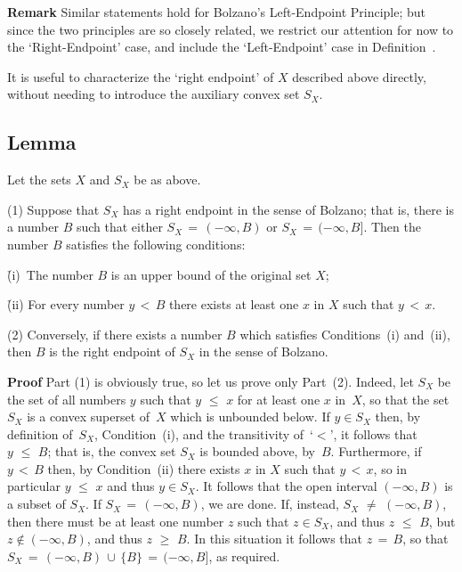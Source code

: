         {\bf Remark} Similar statements hold for Bolzano's Left-Endpoint Principle; but since the two principles are so closely related,
    we restrict our attention for now to the `Right-Endpoint' case, and include the `Left-Endpoint' case in Definition~.

\VV

        It is useful to characterize the `right endpoint' of $X$ described above directly,
    without needing to introduce the auxiliary convex set $S_{X}$.

\V

            \subsection{\small{{\bf Lemma}}}
            \label{LemmaB30.08}

\V

         Let the sets $X$ and $S_{X}$ be as above.

\V

        (1) Suppose that $S_{X}$ has a right endpoint in the sense of Bolzano;
that is, there is a number $B$
    such that either $S_{X} \,=\, (-{\infty},B)$ or $S_{X} \,=\, (-{\infty},B]$. Then the number $B$ satisfies the following conditions:

\VA

        \h (i)\, The number $B$ is an upper bound of the original set $X$;

        \h (ii) For every number $y\,<\,B$ there exists at least one $x$ in $X$ such that $y\,<\,x$.

\VA

        (2) Conversely, if there exists a number $B$ which satisfies Conditions~(i) and~(ii),
    then $B$ is the right endpoint of $S_{X}$ in the sense of Bolzano.

\V

        {\bf Proof} Part (1) is obviously true, so let us prove only Part~(2).
    Indeed, let $S_{X}$ be the set of all numbers $y$ such that $y\,\,{\leq}\,\,x$ for at least one $x$ in~$X$,
    so that the set $S_{X}$ is a convex superset of~$X$ which is unbounded below.
    If $y{\in}S_{X}$ then, by definition of~$S_{X}$, Condition~(i), and the transitivity of~`$<$',
    it follows that $y\,\,{\leq}\,\,B$; that is, the convex set $S_{X}$ is bounded above, by~$B$.
    Furthermore, if $y\,<\,B$ then, by Condition~(ii) there exists $x$ in $X$ such that $y\,<\,x$, so in particular $y\,\,{\leq}\,\,x$ and thus $y{\in}S_{X}$.
    It follows that the open interval $(-{\infty},B)$ is a subset of $S_{X}$. If $S_{X}  \,=\, (-{\infty},B)$, we are done.
    If, instead, $S_{X} \,\,{\neq}\,\, (-{\infty},B)$, then there must be at least one number $z$ such that $z{\in}S_{X}$, and thus $z\,\,{\leq}\,\,B$, but $z \not \in (-{\infty},B)$, and thus $z\,\,{\geq}\,\,B$.
    In this situation it follows that $z \,=\, B$, so that $S_{X} \,=\, (-{\infty},B)\,{\cup}\,\{B\} \,=\, (-{\infty}, B]$, as required.

